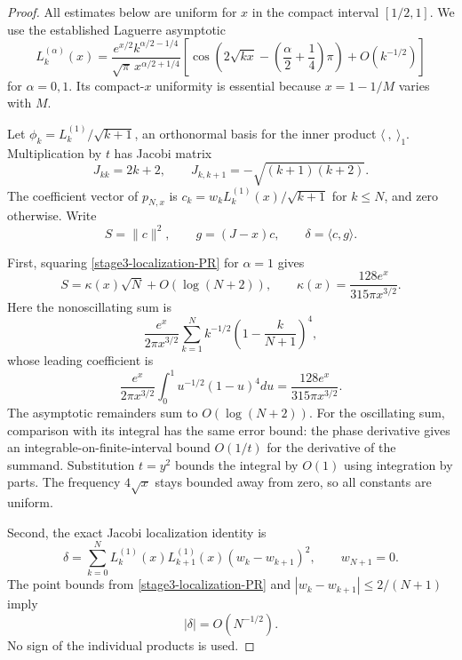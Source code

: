 \documentclass[11pt,a4paper]{article}
\theoremstyle{definition}
\theoremstyle{remark}
\begin{document}
\begin{proof}
All estimates below are uniform for $x$ in the compact interval $[1/2,1]$.
We use the established Laguerre asymptotic
\cite{dlmf-laguerre-asymptotic}
\begin{equation}
 L_k^{(\alpha)}(x)=
 \frac{e^{x/2}k^{\alpha/2-1/4}}
      {\sqrt{\pi}\,x^{\alpha/2+1/4}}
 \left[
 \cos\!\left(2\sqrt{kx}
       -\left(\frac{\alpha}{2}+\frac14\right)\pi\right)
 +O(k^{-1/2})\right]
 \label{stage3-localization-PR}
\end{equation}
for $\alpha=0,1$. Its compact-$x$ uniformity is essential because
$x=1-1/M$ varies with $M$.

Let $\phi_k=L_k^{(1)}/\sqrt{k+1}$, an orthonormal basis for the inner
product $\langle\ ,\ \rangle_1$. Multiplication by $t$ has Jacobi matrix
\[
 J_{kk}=2k+2,\qquad
 J_{k,k+1}=-\sqrt{(k+1)(k+2)}.
\]
The coefficient vector of $p_{N,x}$ is
$c_k=w_kL_k^{(1)}(x)/\sqrt{k+1}$ for $k\le N$, and zero otherwise.
Write
\[
 S=\|c\|^2,\qquad g=(J-x)c,\qquad \delta=\langle c,g\rangle.
\]

First, squaring \eqref{stage3-localization-PR} for $\alpha=1$ gives
\begin{equation}
 S=\kappa(x)\sqrt N+O(\log(N+2)),\qquad
 \kappa(x)=\frac{128e^x}{315\pi x^{3/2}}.
 \label{stage3-localization-norm}
\end{equation}
Here the nonoscillating sum is
\[
 \frac{e^x}{2\pi x^{3/2}}
 \sum_{k=1}^N k^{-1/2}\left(1-\frac{k}{N+1}\right)^4,
\]
whose leading coefficient is
\[
 \frac{e^x}{2\pi x^{3/2}}
 \int_0^1u^{-1/2}(1-u)^4du
 =\frac{128e^x}{315\pi x^{3/2}}.
\]
The asymptotic remainders sum to $O(\log(N+2))$. For the oscillating
sum, comparison with its integral has the same error bound:
the phase derivative gives an integrable-on-finite-interval bound
$O(1/t)$ for the derivative of the summand. Substitution $t=y^2$
bounds the integral by $O(1)$ using integration by parts. The frequency
$4\sqrt x$ stays bounded away from zero, so all constants are uniform.

Second, the exact Jacobi localization identity is
\[
 \delta=\sum_{k=0}^{N}
 L_k^{(1)}(x)L_{k+1}^{(1)}(x)(w_k-w_{k+1})^2,
 \qquad w_{N+1}=0.
\]
The point bounds from \eqref{stage3-localization-PR} and
$|w_k-w_{k+1}|\le2/(N+1)$ imply
\begin{equation}
 |\delta|=O(N^{-1/2}).
 \label{stage3-localization-mean}
\end{equation}
No sign of the individual products is used.


\end{proof}
\end{document}
